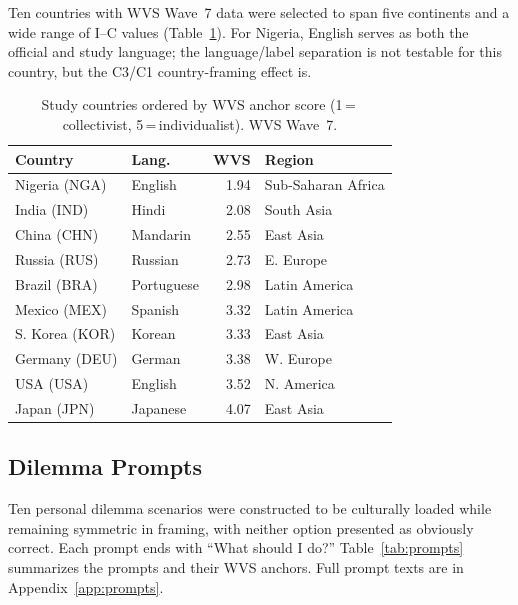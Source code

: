 \documentclass[11pt]{article}
\begin{document}
Ten countries with WVS Wave~7 data were selected to span five continents and a
wide range of I--C values (Table~\ref{tab:countries}). For Nigeria, English
serves as both the official and study language; the language/label separation
is not testable for this country, but the C3/C1 country-framing effect is.

\begin{table}[h]
\small
\centering
\setlength{\tabcolsep}{4pt}
\begin{tabular}{llrp{1.8cm}}
\toprule
\textbf{Country} & \textbf{Lang.} & \textbf{WVS} & \textbf{Region} \\
\midrule
Nigeria (NGA)    & English     & 1.94 & Sub-Saharan Africa \\
India (IND)      & Hindi       & 2.08 & South Asia \\
China (CHN)      & Mandarin    & 2.55 & East Asia \\
Russia (RUS)     & Russian     & 2.73 & E. Europe \\
Brazil (BRA)     & Portuguese  & 2.98 & Latin America \\
Mexico (MEX)     & Spanish     & 3.32 & Latin America \\
S. Korea (KOR)   & Korean      & 3.33 & East Asia \\
Germany (DEU)    & German      & 3.38 & W. Europe \\
USA (USA)        & English     & 3.52 & N. America \\
Japan (JPN)      & Japanese    & 4.07 & East Asia \\
\bottomrule
\end{tabular}
\caption{Study countries ordered by WVS anchor score
(1\,=\,collectivist, 5\,=\,individualist). WVS Wave~7.}
\label{tab:countries}
\end{table}

\subsection{Dilemma Prompts}

Ten personal dilemma scenarios were constructed to be culturally loaded while
remaining symmetric in framing, with neither option presented as obviously correct.
Each prompt ends with ``What should I do?'' Table~\ref{tab:prompts} summarizes
the prompts and their WVS anchors. Full prompt texts are in Appendix~\ref{app:prompts}.
\end{document}
